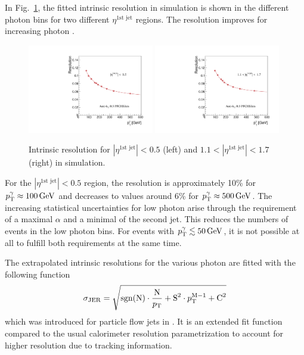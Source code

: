 In Fig.~\ref{fig:ResolutionOfPtgamma}, the fitted intrinsic resolution in simulation is shown in the different photon \pt bins for two different $\eta^{\text{1st jet}}$ regions.
The resolution improves for increasing photon \pt. 
\begin{figure}[tbp]
  \centering
    \includegraphics[width=0.49\textwidth]{figures/resolution/methodology/Resolution_for_1_eta_bin_PFCHS_mc_RMS99.pdf}
    \includegraphics[width=0.49\textwidth]{figures/resolution/methodology/Resolution_for_3_eta_bin_PFCHS_mc_RMS99.pdf}
  \caption{Intrinsic resolution for $|\eta^{\text{1st jet}}| < 0.5$ (left) and $1.1<|\eta^{\text{1st jet}}| < 1.7$ (right) in simulation.}  
  \label{fig:ResolutionOfPtgamma}
\end{figure}
For the $|\eta^{\text{1st jet}}|<0.5$ region, the resolution is approximately 10\% for $p_{\text{T}}^{\gamma} \approx 100\,\text{Ge}\kern-0.06667em\text{V}$ and decreases to values around 6\% for  
$p_{\text{T}}^{\gamma} \approx 500\,\text{Ge}\kern-0.06667em\text{V}$.
The increasing statistical uncertainties for low photon \pt arise through the requirement of a maximal $\alpha$ and a minimal \pt of the second jet. 
This reduces the numbers of events in the low photon \pt bins. 
For events with ${p}_\mathrm{T}^{\gamma} \lesssim 50\,\text{Ge}\kern-0.06667em\text{V}$, it is not possible at all to fulfill both requirements at the same time.

The extrapolated intrinsic resolutions for the various photon \pt are fitted with the following function
\begin{equation}
\label{eq:PFresolution}
\sigma_\mathrm{JER} = \sqrt{\text{sgn(N)} \cdot \frac{\text{N}}{p_{\text{T}}}  + \text{S}^2 \cdot p_{\text{T}}^{\text{M}-1} +  \text{C}^2 }
\end{equation}
which was introduced for particle flow jets in \cite{bib:CMS:JERCPaper_2011}. 
It is an extended fit function compared to the usual calorimeter resolution parametrization to account for higher resolution due to tracking information. 

